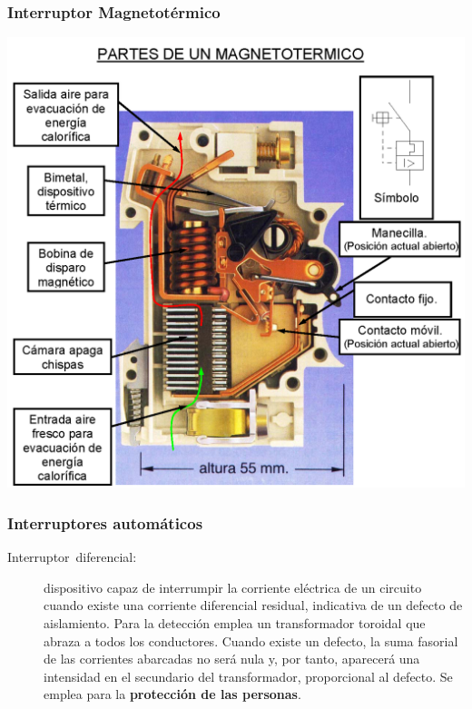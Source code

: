 \documentclass[serif, xcolor=dvipsnames]{beamer}
\begin{document}
\begin{frame}
  \frametitle{Interruptor Magnetotérmico}

  \begin{center}
    \includegraphics[scale=0.3]{../figs/SeccionMagnetotermico}
    \par\end{center}


\end{frame}
\begin{frame}
  \frametitle{Interruptores automáticos}
  \begin{description}
  \item [{Interruptor~diferencial:}] dispositivo capaz de interrumpir
    la corriente eléctrica de un circuito cuando existe una corriente
    diferencial residual, indicativa de un defecto de
    aislamiento. Para la detección emplea un transformador toroidal
    que abraza a todos los conductores.  Cuando existe un defecto, la
    suma fasorial de las corrientes abarcadas no será nula y, por
    tanto, aparecerá una intensidad en el secundario del
    transformador, proporcional al defecto. Se emplea para la
    \textbf{protección de las personas}.
  \end{description}

\end{frame}
\end{document}
